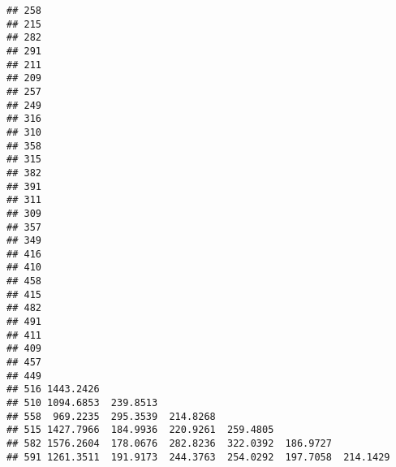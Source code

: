 \documentclass[
]{article}
\begin{document}
\begin{verbatim}
## 258                                                                      
## 215                                                                      
## 282                                                                      
## 291                                                                      
## 211                                                                      
## 209                                                                      
## 257                                                                      
## 249                                                                      
## 316                                                                      
## 310                                                                      
## 358                                                                      
## 315                                                                      
## 382                                                                      
## 391                                                                      
## 311                                                                      
## 309                                                                      
## 357                                                                      
## 349                                                                      
## 416                                                                      
## 410                                                                      
## 458                                                                      
## 415                                                                      
## 482                                                                      
## 491                                                                      
## 411                                                                      
## 409                                                                      
## 457                                                                      
## 449                                                                      
## 516 1443.2426                                                            
## 510 1094.6853  239.8513                                                  
## 558  969.2235  295.3539  214.8268                                        
## 515 1427.7966  184.9936  220.9261  259.4805                              
## 582 1576.2604  178.0676  282.8236  322.0392  186.9727                    
## 591 1261.3511  191.9173  244.3763  254.0292  197.7058  214.1429          

\end{verbatim}
\end{document}
